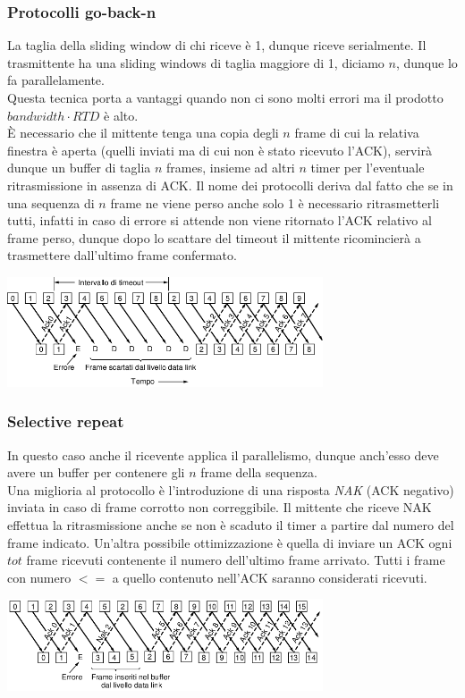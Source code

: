 \documentclass[10pt,a4paper,twoside]{article}
\begin{document}
\subsubsection{Protocolli go-back-n}
La taglia della sliding window di chi riceve è 1, dunque riceve serialmente. Il trasmittente ha una sliding windows di taglia maggiore di 1, diciamo $n$, dunque lo fa parallelamente.\\
Questa tecnica porta a vantaggi quando non ci sono molti errori ma il prodotto $bandwidth \cdot RTD$ è alto.\\
È necessario che il mittente tenga una copia degli $n$ frame di cui la relativa finestra è aperta (quelli inviati ma di cui non è stato ricevuto l'ACK), servirà dunque un buffer di taglia $n$ frames, insieme ad altri $n$ timer per l'eventuale ritrasmissione in assenza di ACK. Il nome dei protocolli deriva dal fatto che se in una sequenza di $n$ frame ne viene perso anche solo 1 è necessario ritrasmetterli tutti, infatti in caso di errore si attende non viene ritornato l'ACK relativo al frame perso, dunque dopo lo scattare del timeout il mittente ricomincierà a trasmettere dall'ultimo frame confermato.
\begin{center}
\includegraphics[width=0.7\textwidth]{images/go_back_n.png}
\end{center}

\subsubsection{Selective repeat}
In questo caso anche il ricevente applica il parallelismo, dunque anch'esso deve avere un buffer per contenere gli $n$ frame della sequenza.\\
Una miglioria al protocollo è l'introduzione di una risposta \textit{NAK} (ACK negativo) inviata in caso di frame corrotto non correggibile. Il mittente che riceve NAK effettua la ritrasmissione anche se non è scaduto il timer a partire dal numero del frame indicato.
Un'altra possibile ottimizzazione è quella di inviare un ACK ogni $tot$ frame ricevuti contenente il numero dell'ultimo frame arrivato. Tutti i frame con numero $<=$ a quello contenuto nell'ACK saranno considerati ricevuti.
\begin{center}
\includegraphics[width=0.7\textwidth]{images/selective_repeat.png}
\end{center}
\end{document}

